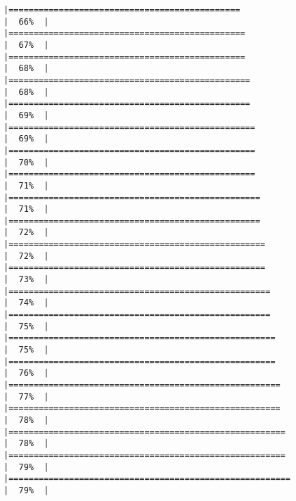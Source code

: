 \documentclass[
]{article}
\begin{document}
\begin{verbatim}
|==============================================                        |  66%  |                                                                              |===============================================                       |  67%  |                                                                              |===============================================                       |  68%  |                                                                              |================================================                      |  68%  |                                                                              |================================================                      |  69%  |                                                                              |=================================================                     |  69%  |                                                                              |=================================================                     |  70%  |                                                                              |=================================================                     |  71%  |                                                                              |==================================================                    |  71%  |                                                                              |==================================================                    |  72%  |                                                                              |===================================================                   |  72%  |                                                                              |===================================================                   |  73%  |                                                                              |====================================================                  |  74%  |                                                                              |====================================================                  |  75%  |                                                                              |=====================================================                 |  75%  |                                                                              |=====================================================                 |  76%  |                                                                              |======================================================                |  77%  |                                                                              |======================================================                |  78%  |                                                                              |=======================================================               |  78%  |                                                                              |=======================================================               |  79%  |                                                                              |========================================================              |  79%  |                                                                              
\end{verbatim}
\end{document}
